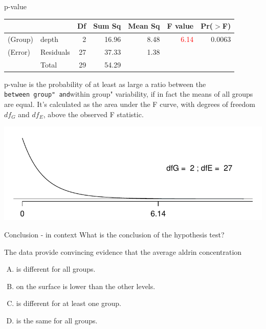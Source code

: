 \documentclass[
  ignorenonframetext,
]{beamer}
\begin{document}
\begin{frame}[fragile]{p-value}
\protect\hypertarget{p-value}{}
\begin{center}
\begin{tabular}{ll rrrrr}
\hline
            &           & Df    & Sum Sq    & Mean Sq   & F value   & Pr($>$F) \\ 
\hline
(\alert{G}roup)     & depth         & 2     & 16.96 & 8.48      & \textcolor{red}{6.14}     & 0.0063 \\ 
(\alert{E}rror)     & Residuals     & 27    & 37.33     & 1.38      &       &  \\ 
\hline
            & \alert{T}otal & 29    & 54.29 \\
\end{tabular}
\end{center}

p-value is the probability of at least as large a ratio between the
\texttt{between\ group"\ and}within group" variability, if in fact the
means of all groups are equal. It's calculated as the area under the F
curve, with degrees of freedom \(df_G\) and \(df_E\), above the observed
F statistic.

\pause

\includegraphics[width=\textwidth,height=0.45\textheight]{f.pdf}
\end{frame}

\begin{frame}{Conclusion - in context}
\protect\hypertarget{conclusion---in-context}{}
\alert{What is the conclusion of the hypothesis test?}

The data provide convincing evidence that the average aldrin
concentration

\begin{enumerate}
[A)]
\item
  is different for all groups.
\item
  on the surface is lower than the other levels.
\item
  is different for at least one group.
\item
  is the same for all groups.
\end{enumerate}
\end{frame}
\end{document}
